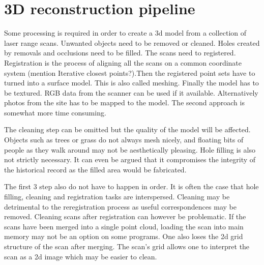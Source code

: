 \section{3D reconstruction pipeline} \label{sec:pipeline}

Some processing is required in order to create a 3d model from a collection of laser range scans. Unwanted objects need to be removed or cleaned. Holes created by removals and occlusions need to be filled. The scans need to registered. Registration is the process of aligning all the scans on a common coordinate system (mention Iterative closest points?).Then the registered point sets have to turned into a surface model. This is also called meshing. Finally the model has to be textured. RGB data from the scanner can be used if it available. Alternatively photos from the site has to be mapped to the model. The second approach is somewhat more time consuming.

The cleaning step can be omitted but the quality of the model will be affected. Objects such as trees or grass do not always mesh nicely, and floating bits of people as they walk around may not be aesthetically pleasing. Hole filling is also not strictly necessary. It can even be argued that it compromises the integrity of the historical record as the filled area would be fabricated.

The first 3 step also do not have to happen in order. It is often the case that hole filling, cleaning and registration tasks are interspersed. Cleaning may be detrimental to the reregistration process as useful correspondences may be removed. Cleaning scans after registration can however be problematic. If the scans have been merged into a single point cloud, loading the scan into main memory may not be an option on some programs. One also loses the 2d grid structure of the scan after merging. The scan's grid allows one to interpret the scan as a 2d image which may be easier to clean.




